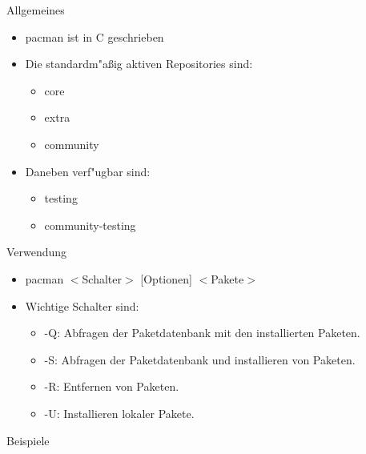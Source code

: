 
\begin{slide}{Allgemeines}
	\begin{itemize}
		\item{pacman ist in C geschrieben}
		\item{Die standardm"{a}ßig aktiven Repositories sind:
			\begin{itemize}
				\item{core}
				\item{extra}
				\item{community}
			\end{itemize}
		}
		\item{Daneben verf"{u}gbar sind:
			\begin{itemize}
				\item{testing}
				\item{community-testing}
			\end{itemize}
		}
	\end{itemize}
\end{slide}

\begin{slide}{Verwendung}
	\begin{itemize}
		\item{pacman $<$Schalter$>$ [Optionen] $<$Pakete$>$}
		\item{Wichtige Schalter sind:
			\begin{itemize}
				\item{-Q: Abfragen der Paketdatenbank mit den installierten
					Paketen.}
				\item{-S: Abfragen der Paketdatenbank und installieren von
					Paketen.}
				\item{-R: Entfernen von Paketen.}
				\item{-U: Installieren lokaler Pakete.}
			\end{itemize}
		}
	\end{itemize}
\end{slide}

\begin{slide}{Beispiele}

\end{slide}


